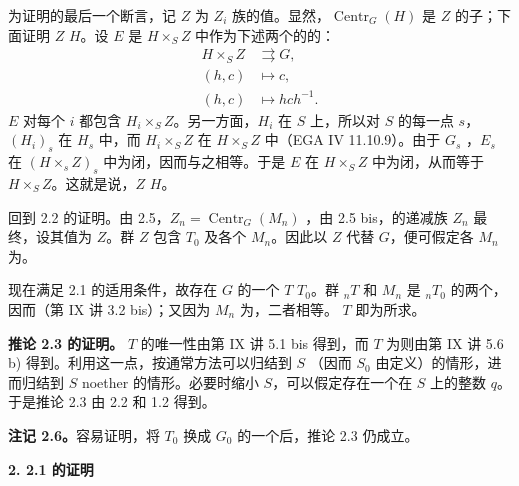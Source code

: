 为证明的最后一个断言，记 $Z$ 为 $Z_i$ 族的值。显然，$\operatorname{Centr}_G(H)$ 是 $Z$ 的子；下面证明 $Z$  $H$。设 $E$ 是 $H\times_S Z$ 中作为下述两个的的：
\[\begin{aligned}
H\times_S Z&\rightrightarrows G,\\
(h,c)&\longmapsto c,\\
(h,c)&\longmapsto hch^{-1}.
\end{aligned}\]
 $E$ 对每个 $i$ 都包含 $H_i\times_S Z$。另一方面，$H_i$ 在 $S$ 上，所以对 $S$ 的每一点 $s$，$(H_i)_s$ 在 $H_s$ 中，而 $H_i\times_S Z$ 在 $H\times_S Z$ 中（EGA IV 11.10.9）。由于 $G_s$ ，$E_s$ 在 $(H\times_s Z)_s$ 中为闭，因而与之相等。于是 $E$ 在 $H\times_S Z$ 中为闭，从而等于 $H\times_S Z$。这就是说，$Z$  $H$。

回到 2.2 的证明。由 2.5，$Z_n=\operatorname{Centr}_G(M_n)$ ，由 2.5 bis，的递减族 $Z_n$ 最终，设其值为 $Z$。群 $Z$ 包含 $T_0$ 及各个 $M_n$。因此以 $Z$ 代替 $G$，便可假定各 $M_n$ 为。

现在满足 2.1 的适用条件，故存在 $G$ 的一个 $T$  $T_0$。群 ${}_nT$ 和 $M_n$ 是 ${}_nT_0$ 的两个，因而（第 IX 讲 3.2 bis）；又因为 $M_n$ 为，二者相等。 $T$ 即为所求。

\textbf{推论 2.3 的证明。}
$T$ 的唯一性由第 IX 讲 5.1 bis 得到，而 $T$ 为则由第 IX 讲 5.6 b) 得到。利用这一点，按通常方法可以归结到 $S$ （因而 $S_0$ 由定义）的情形，进而归结到 $S$ noether 的情形。必要时缩小 $S$，可以假定存在一个在 $S$ 上的整数 $q$。于是推论 2.3 由 2.2 和 1.2 得到。

\textbf{注记 2.6。}容易证明，将 $T_0$ 换成 $G_0$ 的一个后，推论 2.3 仍成立。

\textbf{2. 2.1 的证明}

